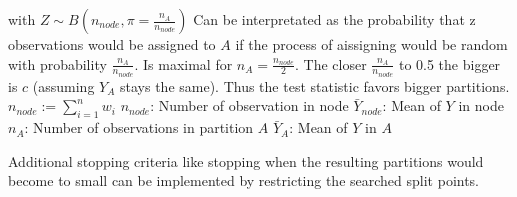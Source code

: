 with
\(Z \sim B(n_{node}, \pi = \frac{n_A}{n_{node}})\) Can be interpretated as the probability that z observations would be assigned to $A$ if the process of aissigning would be random with probability $\frac{n_A}{n_{node}}$. Is maximal for \(n_A = \frac{n_{node}}{2}\). The closer \(\frac{n_A}{n_{node}}\) to 0.5 the bigger is $c$ (assuming $Y_A$ stays the same). Thus the test statistic favors bigger partitions. 
\(n_{node} := \sum\limits_{i=1}^n w_i\)
\(n_{node}\): Number of observation in node 
\(\bar{Y}_{node}\): Mean of $Y$ in node
\(n_A\): Number of observations in partition $A$
\(\bar{Y}_A\): Mean of $Y$ in $A$

  
  
Additional stopping criteria like stopping when the resulting partitions would become to small can be implemented by restricting the searched split points. 
